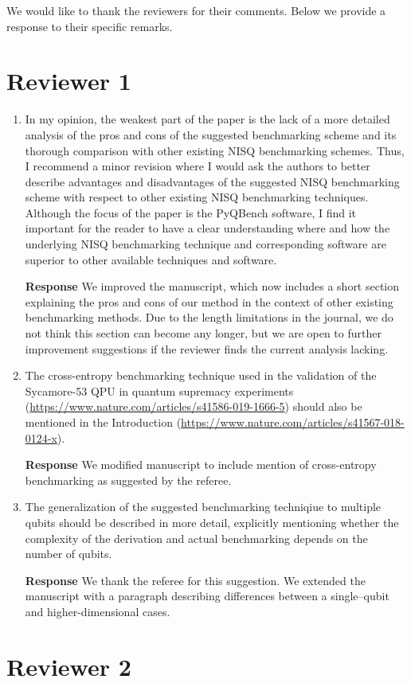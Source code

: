 \documentclass[a4paper,12pt]{article}
\newcommand{\1}{{\rm 1\hspace{-0.9mm}l}}
\newenvironment{response}{\vspace{1em}\noindent\textbf{Response}}{\vspace{1em}}
\begin{document}
We would like to thank the reviewers for their comments. Below we provide
a response to their specific remarks.

\section{Reviewer 1}

\begin{enumerate}
  \item  In my opinion, the weakest part of the paper is the lack of a more
    detailed analysis of the pros and cons of the suggested benchmarking scheme
    and its thorough comparison with other existing NISQ benchmarking schemes.
    Thus, I recommend a minor revision where I would ask the authors to better
    describe advantages and disadvantages of the suggested NISQ benchmarking
    scheme with respect to other existing NISQ benchmarking techniques.
    Although the focus of the paper is the PyQBench software, I find it
    important for the reader to have a clear understanding where and how the
    underlying NISQ benchmarking technique and corresponding software are
    superior to other available techniques and software.

    \begin{response}
      We improved the manuscript, which now includes a short section explaining
      the pros and cons of our method in the context of other existing
      benchmarking methods. Due to the length limitations in the journal, we do
      not think this section can become any longer, but we are open to further
      improvement suggestions if the reviewer finds the current analysis
      lacking.
    \end{response}
  \item The cross-entropy benchmarking technique used in the validation of the
    Sycamore-53 QPU in quantum supremacy experiments
    (\url{https://www.nature.com/articles/s41586-019-1666-5}) should also be
    mentioned in the Introduction
    (\url{https://www.nature.com/articles/s41567-018-0124-x}).

    \begin{response} We modified manuscript to include mention of cross-entropy
                     benchmarking as suggested by the referee.
    \end{response}
  \item The generalization of the suggested benchmarking techniqiue to multiple
    qubits should be described in more detail, explicitly mentioning whether
    the complexity of the derivation and actual benchmarking depends on the
    number of qubits.

    \begin{response} We thank the referee for this suggestion. We extended the
                     manuscript with a paragraph describing differences between
                     a single--qubit and higher-dimensional cases.
    \end{response}

\end{enumerate}
\section{Reviewer 2}
\end{document}
